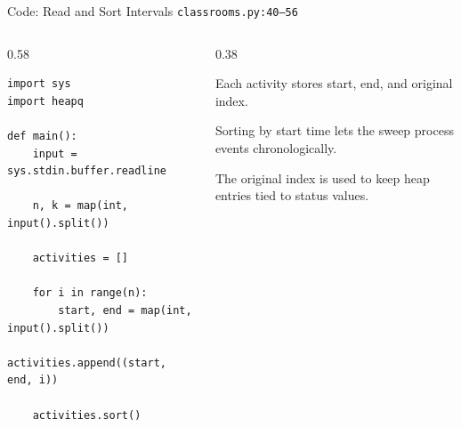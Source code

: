 \documentclass[aspectratio=169,11pt]{beamer}
\begin{document}
\begin{frame}[fragile]{Code: Read and Sort Intervals}
\scriptsize
{} \texttt{classrooms.py:40--56}

\vspace{0.08cm}
\begin{columns}[T,totalwidth=\textwidth]
\begin{column}{0.58\textwidth}
\begin{lstlisting}[style=cpcode]
import sys
import heapq

def main():
    input = sys.stdin.buffer.readline

    n, k = map(int, input().split())

    activities = []

    for i in range(n):
        start, end = map(int, input().split())
        activities.append((start, end, i))

    activities.sort()
\end{lstlisting}
\end{column}
\begin{column}{0.38\textwidth}
\begin{tightitemize}
  \item Each activity stores start, end, and original index.
  \item Sorting by start time lets the sweep process events chronologically.
  \item The original index is used to keep heap entries tied to status values.
\end{tightitemize}
\end{column}
\end{columns}
\end{frame}
\end{document}
